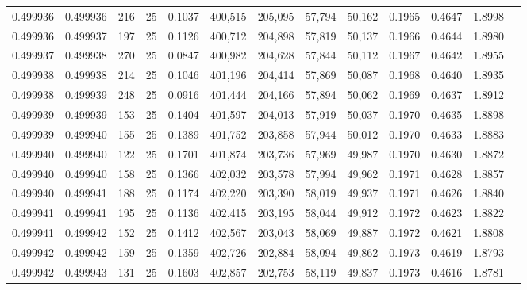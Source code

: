 \begin{tabular}{rrrrrrrrrrrrr}
0.499936 & 0.499936 & 216 &  25 &                                     0.1037 & 400,515 & 205,095 &  57,794 &  50,162 & 0.1965 & 0.4647 & 1.8998 \\
0.499936 & 0.499937 & 197 &  25 &                                     0.1126 & 400,712 & 204,898 &  57,819 &  50,137 & 0.1966 & 0.4644 & 1.8980 \\
0.499937 & 0.499938 & 270 &  25 &                                     0.0847 & 400,982 & 204,628 &  57,844 &  50,112 & 0.1967 & 0.4642 & 1.8955 \\
0.499938 & 0.499938 & 214 &  25 &                                     0.1046 & 401,196 & 204,414 &  57,869 &  50,087 & 0.1968 & 0.4640 & 1.8935 \\
0.499938 & 0.499939 & 248 &  25 &                                     0.0916 & 401,444 & 204,166 &  57,894 &  50,062 & 0.1969 & 0.4637 & 1.8912 \\
0.499939 & 0.499939 & 153 &  25 &                                     0.1404 & 401,597 & 204,013 &  57,919 &  50,037 & 0.1970 & 0.4635 & 1.8898 \\
0.499939 & 0.499940 & 155 &  25 &                                     0.1389 & 401,752 & 203,858 &  57,944 &  50,012 & 0.1970 & 0.4633 & 1.8883 \\
0.499940 & 0.499940 & 122 &  25 &                                     0.1701 & 401,874 & 203,736 &  57,969 &  49,987 & 0.1970 & 0.4630 & 1.8872 \\
0.499940 & 0.499940 & 158 &  25 &                                     0.1366 & 402,032 & 203,578 &  57,994 &  49,962 & 0.1971 & 0.4628 & 1.8857 \\
0.499940 & 0.499941 & 188 &  25 &                                     0.1174 & 402,220 & 203,390 &  58,019 &  49,937 & 0.1971 & 0.4626 & 1.8840 \\
0.499941 & 0.499941 & 195 &  25 &                                     0.1136 & 402,415 & 203,195 &  58,044 &  49,912 & 0.1972 & 0.4623 & 1.8822 \\
0.499941 & 0.499942 & 152 &  25 &                                     0.1412 & 402,567 & 203,043 &  58,069 &  49,887 & 0.1972 & 0.4621 & 1.8808 \\
0.499942 & 0.499942 & 159 &  25 &                                     0.1359 & 402,726 & 202,884 &  58,094 &  49,862 & 0.1973 & 0.4619 & 1.8793 \\
0.499942 & 0.499943 & 131 &  25 &                                     0.1603 & 402,857 & 202,753 &  58,119 &  49,837 & 0.1973 & 0.4616 & 1.8781 \\

\end{tabular}
